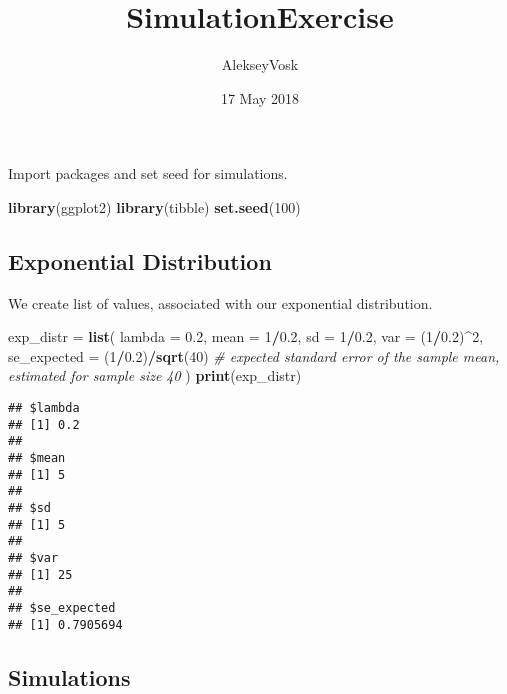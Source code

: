 \documentclass[]{article}
\title{SimulationExercise}
\author{AlekseyVosk}
\date{17 May 2018}
\newenvironment{Shaded}{\begin{snugshade}}{\end{snugshade}}
\newcommand{\KeywordTok}[1]{\textcolor[rgb]{0.13,0.29,0.53}{\textbf{#1}}}
\newcommand{\DataTypeTok}[1]{\textcolor[rgb]{0.13,0.29,0.53}{#1}}
\newcommand{\DecValTok}[1]{\textcolor[rgb]{0.00,0.00,0.81}{#1}}
\newcommand{\FloatTok}[1]{\textcolor[rgb]{0.00,0.00,0.81}{#1}}
\newcommand{\StringTok}[1]{\textcolor[rgb]{0.31,0.60,0.02}{#1}}
\newcommand{\CommentTok}[1]{\textcolor[rgb]{0.56,0.35,0.01}{\textit{#1}}}
\newcommand{\OperatorTok}[1]{\textcolor[rgb]{0.81,0.36,0.00}{\textbf{#1}}}
\newcommand{\NormalTok}[1]{#1}
\begin{document}
\maketitle

Import packages and set seed for simulations.

\begin{Shaded}
\begin{Highlighting}[]
\KeywordTok{library}\NormalTok{(ggplot2)}
\KeywordTok{library}\NormalTok{(tibble)}
\KeywordTok{set.seed}\NormalTok{(}\DecValTok{100}\NormalTok{)}
\end{Highlighting}
\end{Shaded}

\subsection{Exponential Distribution}\label{exponential-distribution}

We create list of values, associated with our exponential distribution.

\begin{Shaded}
\begin{Highlighting}[]
\NormalTok{exp_distr =}\StringTok{ }\KeywordTok{list}\NormalTok{(}
  \DataTypeTok{lambda =} \FloatTok{0.2}\NormalTok{,}
  \DataTypeTok{mean =} \DecValTok{1}\OperatorTok{/}\FloatTok{0.2}\NormalTok{,}
  \DataTypeTok{sd =} \DecValTok{1}\OperatorTok{/}\FloatTok{0.2}\NormalTok{,}
  \DataTypeTok{var =}\NormalTok{ (}\DecValTok{1}\OperatorTok{/}\FloatTok{0.2}\NormalTok{)}\OperatorTok{^}\DecValTok{2}\NormalTok{,}
  \DataTypeTok{se_expected =}\NormalTok{ (}\DecValTok{1}\OperatorTok{/}\FloatTok{0.2}\NormalTok{)}\OperatorTok{/}\KeywordTok{sqrt}\NormalTok{(}\DecValTok{40}\NormalTok{)    }\CommentTok{# expected standard error of the sample mean, estimated for sample size 40}
\NormalTok{)}
\KeywordTok{print}\NormalTok{(exp_distr)}
\end{Highlighting}
\end{Shaded}

\begin{verbatim}
## $lambda
## [1] 0.2
## 
## $mean
## [1] 5
## 
## $sd
## [1] 5
## 
## $var
## [1] 25
## 
## $se_expected
## [1] 0.7905694
\end{verbatim}

\subsection{Simulations}\label{simulations}
\end{document}
